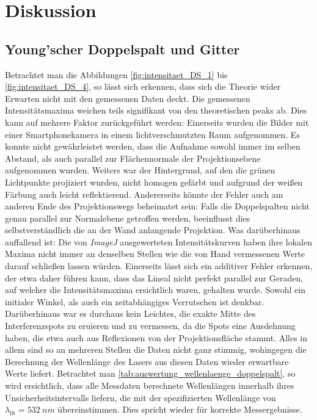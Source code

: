 \documentclass[ngerman]{scrartcl}
\begin{document}
\section{Diskussion}
\label{sec:diskussion}

\subsection{Young'scher Doppelspalt und Gitter}
\label{subsec:diskussion_doppelspalt_gitter_gitter}

Betrachtet man die Abbildungen \ref{fig:intensitaet_DS_1} bis \ref{fig:intensitaet_DS_4}, so lässt sich erkennen, dass sich die Theorie wider Erwarten nicht mit den gemessenen Daten deckt. Die gemessenen Intensitätsmaxima weichen teils signifikant von den theoretischen peaks ab. Dies kann auf mehrere Faktor zurückgeführt werden: Einerseits wurden die Bilder mit einer Smartphonekamera in einem lichtverschmutzten Raum aufgenommen. Es konnte nicht gewährleistet werden, dass die Aufnahme sowohl immer im selben Abstand, als auch parallel zur Flächennormale der Projektionsebene aufgenommen wurden. Weiters war der Hintergrund, auf den die grünen Lichtpunkte projiziert wurden, nicht homogen gefärbt und aufgrund der weißen Färbung auch leicht reflektierend. Andererseits könnte der Fehler auch am anderen Ende des Projektionswegs beheimatet sein: Falls die Doppelspalten nicht genau parallel zur Normalebene getroffen werden, beeinflusst dies selbstverständlich die an der Wand anlangende Projektion. Was darüberhinaus auffallend ist: Die von \textit{ImageJ} ausgewerteten Intensitätskurven haben ihre lokalen Maxima nicht immer an denselben Stellen wie die von Hand vermessenen Werte darauf schließen lassen würden. Einerseits lässt sich ein additiver Fehler erkennen, der etwa daher führen kann, dass das Lineal nicht perfekt parallel zur Geraden, auf welcher die Intensitätsmaxima ersichtlich waren, gehalten wurde. Sowohl ein initialer Winkel, als auch ein zeitabhängiges Verrutschen ist denkbar. Darüberhinaus war es durchaus kein Leichtes, die exakte Mitte des Interferenzspots zu eruieren und zu vermessen, da die Spots eine Ausdehnung haben, die etwa auch aus Reflexionen von der Projektionsfläche stammt. Alles in allem sind so an mehreren Stellen die Daten nicht ganz stimmig, wohingegen die Berechnung der Wellenlänge des Lasers aus diesen Daten wieder erwartbare Werte liefert. Betrachtet man \autoref{tab:auswertung_wellenlaenge_doppelspalt}, so wird ersichtlich, dass alle Messdaten berechnete Wellenlängen innerhalb ihres Unsicherheitsintervalls liefern, die mit der spezifizierten Wellenlänge von $\lambda_{\text{lit}}=\SI{532}{nm}$ übereinstimmen. Dies spricht wieder für korrekte Messergebnisse.
\end{document}
